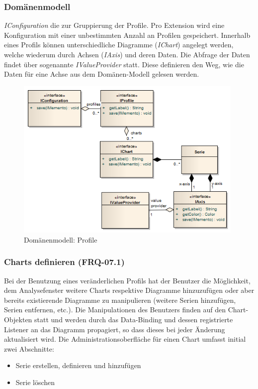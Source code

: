 \subsubsection{Domänenmodell}
\textit{IConfiguration} die zur Gruppierung der Profile. Pro Extension wird eine Konfiguration mit einer unbestimmten Anzahl an Profilen gespeichert. Innerhalb eines Profils können unterschiedliche Diagramme (\textit{IChart}) angelegt werden, welche wiederum durch Achsen (\textit{IAxis}) und deren Daten. Die Abfrage der Daten findet über sogenannte \textit{IValueProvider} statt. Diese definieren den Weg, wie die Daten für eine Achse aus dem Domänen-Modell gelesen werden.
 \begin{figure}[H]
  	\centering
    	\includegraphics[width=11cm]{images/core_domain_profiles}
        	\caption{Domänenmodell: Profile}
\end{figure}

\subsubsection{Charts definieren (FRQ-07.1)}
Bei der Benutzung eines veränderlichen Profils hat der Benutzer die Möglichkeit, dem Analysefenster weitere Charts respektive Diagramme hinzuzufügen oder aber bereits existierende Diagramme zu manipulieren (weitere Serien hinzufügen, Serien entfernen, etc.). Die Manipulationen des Benutzers finden auf den Chart-Objekten statt und werden durch das Data-Binding und dessen registrierte Listener an das Diagramm propagiert, so dass dieses bei jeder Änderung aktualisiert wird. Die Administrationsoberfläche für einen Chart umfasst initial zwei Abschnitte:
\begin{itemize}
	\item Serie erstellen, definieren und hinzufügen
	 \item Serie löschen
\end{itemize}

